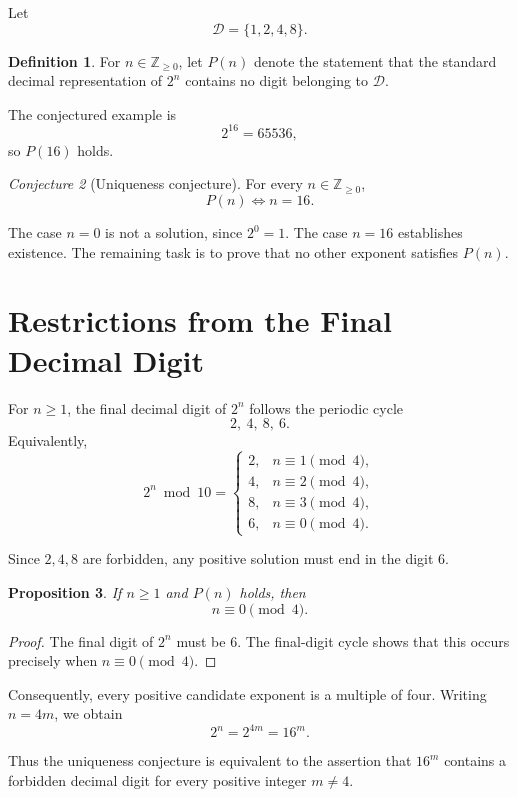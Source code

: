 \documentclass[11pt,a4paper]{article}
\theoremstyle{definition}
\newtheorem{definition}{Definition}[section]
\theoremstyle{plain}
\newtheorem{proposition}[definition]{Proposition}
\theoremstyle{remark}
\newtheorem{conjecture}[definition]{Conjecture}
\newcommand{\forbidden}{\mathcal{D}}
\begin{document}
Let
\[
\forbidden=\{1,2,4,8\}.
\]

\begin{definition}
For \(n\in\mathbb{Z}_{\geq 0}\), let \(P(n)\) denote the statement
that the standard decimal representation of \(2^n\) contains no
digit belonging to \(\forbidden\).
\end{definition}

The conjectured example is
\[
2^{16}=65536,
\]
so \(P(16)\) holds.

\begin{conjecture}[Uniqueness conjecture]
For every \(n\in\mathbb{Z}_{\geq 0}\),
\[
P(n)\iff n=16.
\]
\end{conjecture}

The case \(n=0\) is not a solution, since \(2^0=1\). The case
\(n=16\) establishes existence. The remaining task is to prove
that no other exponent satisfies \(P(n)\).

\section{Restrictions from the Final Decimal Digit}

For \(n\geq 1\), the final decimal digit of \(2^n\) follows the
periodic cycle
\[
2,\ 4,\ 8,\ 6.
\]
Equivalently,
\[
2^n\bmod 10 =
\begin{cases}
2,&n\equiv 1\pmod 4,\\
4,&n\equiv 2\pmod 4,\\
8,&n\equiv 3\pmod 4,\\
6,&n\equiv 0\pmod 4.
\end{cases}
\]

Since \(2,4,8\) are forbidden, any positive solution must end
in the digit \(6\).

\begin{proposition}
If \(n\geq 1\) and \(P(n)\) holds, then
\[
n\equiv 0\pmod 4.
\]
\end{proposition}

\begin{proof}
The final digit of \(2^n\) must be \(6\). The final-digit cycle
shows that this occurs precisely when \(n\equiv 0\pmod 4\).
\end{proof}

Consequently, every positive candidate exponent is a multiple
of four. Writing \(n=4m\), we obtain
\[
2^n=2^{4m}=16^m.
\]

Thus the uniqueness conjecture is equivalent to the assertion
that \(16^m\) contains a forbidden decimal digit for every positive
integer \(m\neq 4\).
\end{document}
